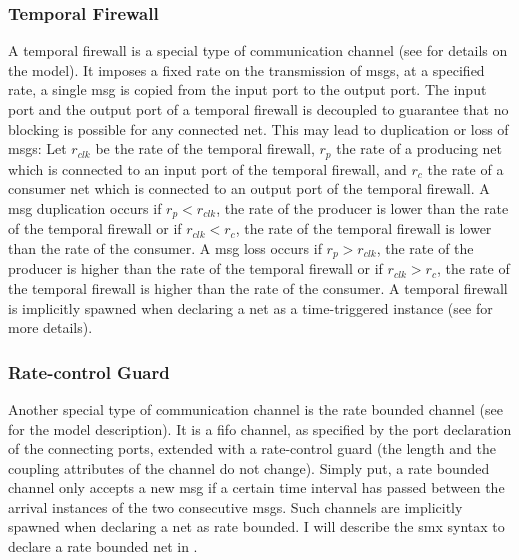 \subsubsection{Temporal Firewall}
\label{sect_smx_box_implicit_tt}
A temporal firewall is a special type of communication channel (see \Sect{\ref{sect_tcm_time_tt}} for details on the model).
It imposes a fixed rate on the transmission of \glspl*{msg}, \ie at a specified rate, a single \gls*{msg} is copied from the input port to the output port.
The input port and the output port of a temporal firewall is decoupled to guarantee that no blocking is possible for any connected net.
This may lead to duplication or loss of \glspl*{msg}:
Let $r_{clk}$ be the rate of the temporal firewall, $r_p$ the rate of a producing net which is connected to an input port of the temporal firewall, and $r_c$ the rate of a consumer net which is connected to an output port of the temporal firewall.
A \gls*{msg} duplication occurs if $r_p < r_{clk}$, \ie the rate of the producer is lower than the rate of the temporal firewall or if $r_{clk} < r_c$, \ie the rate of the temporal firewall is lower than the rate of the consumer.
A \gls*{msg} loss occurs if $r_p > r_{clk}$, \ie the rate of the producer is higher than the rate of the temporal firewall or if $r_{clk} > r_c$, \ie the rate of the temporal firewall is higher than the rate of the consumer.
A temporal firewall is implicitly spawned when declaring a net as a time-triggered instance (see \Sect{\ref{sect_smx_network_time}} for more details).

\subsubsection{Rate-control Guard}
\label{sect_smx_box_implicit_tb}
Another special type of communication channel is the rate bounded channel (see \Sect{\ref{sect_cci_decoupling_rate}} for the model description).
It is a \gls{fifo} channel, as specified by the port declaration of the connecting ports, extended with a rate-control guard (the length and the coupling attributes of the channel do not change).
Simply put, a rate bounded channel only accepts a new \gls*{msg} if a certain time interval has passed between the arrival instances of the two consecutive \glspl*{msg}.
Such channels are implicitly spawned when declaring a net as rate bounded.
I will describe the \gls*{smx} syntax to declare a rate bounded net in \Sect{\ref{sect_smx_network_time}}.

